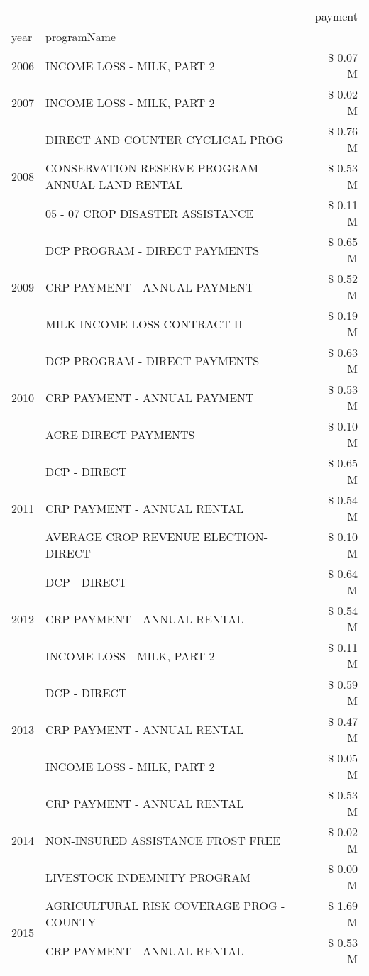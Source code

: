 \begin{tabular}{llr}
\toprule
 &  & payment \\
year & programName &  \\
\midrule
2006 & INCOME LOSS - MILK, PART 2 & \$ 0.07 M \\
\cline{1-3}
2007 & INCOME LOSS - MILK, PART 2 & \$ 0.02 M \\
\cline{1-3}
\multirow[t]{3}{*}{2008} & DIRECT AND COUNTER CYCLICAL PROG & \$ 0.76 M \\
 & CONSERVATION RESERVE PROGRAM - ANNUAL LAND RENTAL & \$ 0.53 M \\
 & 05 - 07 CROP DISASTER ASSISTANCE & \$ 0.11 M \\
\cline{1-3}
\multirow[t]{3}{*}{2009} & DCP PROGRAM - DIRECT PAYMENTS & \$ 0.65 M \\
 & CRP PAYMENT - ANNUAL PAYMENT & \$ 0.52 M \\
 & MILK INCOME LOSS CONTRACT II & \$ 0.19 M \\
\cline{1-3}
\multirow[t]{3}{*}{2010} & DCP PROGRAM - DIRECT PAYMENTS & \$ 0.63 M \\
 & CRP PAYMENT - ANNUAL PAYMENT & \$ 0.53 M \\
 & ACRE DIRECT PAYMENTS & \$ 0.10 M \\
\cline{1-3}
\multirow[t]{3}{*}{2011} & DCP - DIRECT & \$ 0.65 M \\
 & CRP PAYMENT - ANNUAL RENTAL & \$ 0.54 M \\
 & AVERAGE CROP REVENUE ELECTION-DIRECT & \$ 0.10 M \\
\cline{1-3}
\multirow[t]{3}{*}{2012} & DCP - DIRECT & \$ 0.64 M \\
 & CRP PAYMENT - ANNUAL RENTAL & \$ 0.54 M \\
 & INCOME LOSS - MILK, PART 2 & \$ 0.11 M \\
\cline{1-3}
\multirow[t]{3}{*}{2013} & DCP - DIRECT & \$ 0.59 M \\
 & CRP PAYMENT - ANNUAL RENTAL & \$ 0.47 M \\
 & INCOME LOSS - MILK, PART 2 & \$ 0.05 M \\
\cline{1-3}
\multirow[t]{3}{*}{2014} & CRP PAYMENT - ANNUAL RENTAL & \$ 0.53 M \\
 & NON-INSURED ASSISTANCE FROST FREE & \$ 0.02 M \\
 & LIVESTOCK INDEMNITY PROGRAM & \$ 0.00 M \\
\cline{1-3}
\multirow[t]{3}{*}{2015} & AGRICULTURAL RISK COVERAGE PROG - COUNTY & \$ 1.69 M \\
 & CRP PAYMENT - ANNUAL RENTAL & \$ 0.53 M \\

\end{tabular}

